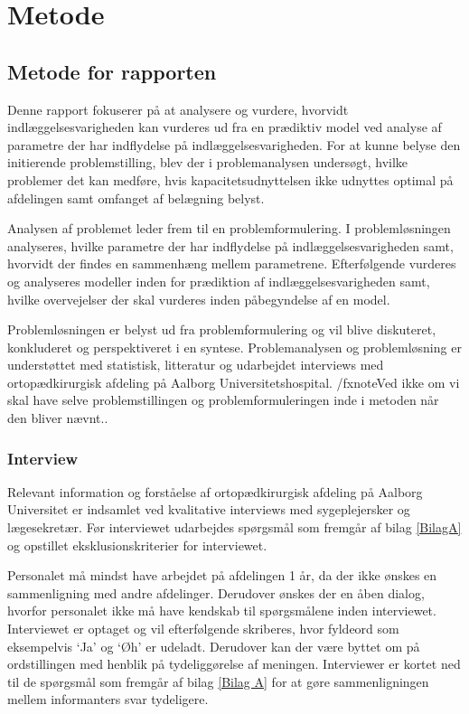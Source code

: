 \chapter*{Metode}
\section*{Metode for rapporten}
Denne rapport fokuserer på at analysere og vurdere, hvorvidt indlæggelsesvarigheden kan vurderes ud fra en prædiktiv model ved analyse af parametre der har indflydelse på indlæggelsesvarigheden. For at kunne belyse den initierende problemstilling, blev der i problemanalysen undersøgt, hvilke problemer det kan medføre, hvis kapacitetsudnyttelsen ikke udnyttes optimal på afdelingen samt omfanget af belægning belyst.


Analysen af problemet leder frem til en problemformulering. I problemløsningen analyseres, hvilke parametre der har indflydelse på indlæggelsesvarigheden samt, hvorvidt der findes en sammenhæng mellem parametrene. Efterfølgende vurderes og analyseres modeller inden for prædiktion af indlæggelsesvarigheden samt, hvilke overvejelser der skal vurderes inden påbegyndelse af en model. 


Problemløsningen er belyst ud fra problemformulering og vil blive diskuteret, konkluderet og perspektiveret i en syntese. Problemanalysen og problemløsning er understøttet med statistisk, litteratur og udarbejdet interviews med ortopædkirurgisk afdeling på Aalborg Universitetshospital.  /fxnote{Ved ikke om vi skal have selve problemstillingen og problemformuleringen inde i metoden når den bliver nævnt.}. 


\subsection*{Interview}
Relevant information og forståelse af ortopædkirurgisk afdeling på Aalborg Universitet er indsamlet ved kvalitative interviews med sygeplejersker og lægesekretær. Før interviewet udarbejdes spørgsmål som fremgår af bilag \ref{BilagA} og opstillet eksklusionskriterier for interviewet. 


Personalet må mindst have arbejdet på afdelingen 1 år, da der ikke ønskes en sammenligning med andre afdelinger. Derudover ønskes der en åben dialog, hvorfor personalet ikke må have kendskab til spørgsmålene inden interviewet. Interviewet er optaget og vil efterfølgende skriberes, hvor fyldeord som eksempelvis ‘Ja’ og ‘Øh’ er udeladt. Derudover kan der være byttet om på ordstillingen med henblik på tydeliggørelse af meningen. Interviewer er kortet ned til de spørgsmål som fremgår af bilag \ref{Bilag A} for at gøre sammenligningen mellem informanters svar tydeligere.  


